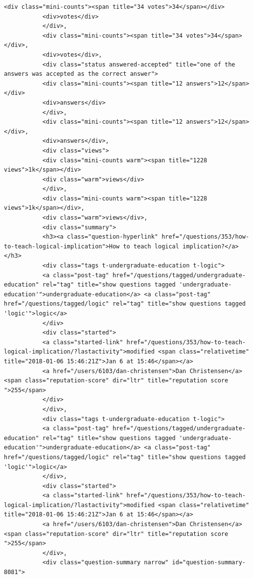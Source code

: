 \documentclass[11pt]{article}
\begin{document}
\begin{Verbatim}[commandchars=\\\{\}]
           <div class="mini-counts"><span title="34 votes">34</span></div>
           <div>votes</div>
           </div>,
           <div class="mini-counts"><span title="34 votes">34</span></div>,
           <div>votes</div>,
           <div class="status answered-accepted" title="one of the answers was accepted as the correct answer">
           <div class="mini-counts"><span title="12 answers">12</span></div>
           <div>answers</div>
           </div>,
           <div class="mini-counts"><span title="12 answers">12</span></div>,
           <div>answers</div>,
           <div class="views">
           <div class="mini-counts warm"><span title="1228 views">1k</span></div>
           <div class="warm">views</div>
           </div>,
           <div class="mini-counts warm"><span title="1228 views">1k</span></div>,
           <div class="warm">views</div>,
           <div class="summary">
           <h3><a class="question-hyperlink" href="/questions/353/how-to-teach-logical-implication">How to teach logical implication?</a></h3>
           <div class="tags t-undergraduate-education t-logic">
           <a class="post-tag" href="/questions/tagged/undergraduate-education" rel="tag" title="show questions tagged 'undergraduate-education'">undergraduate-education</a> <a class="post-tag" href="/questions/tagged/logic" rel="tag" title="show questions tagged 'logic'">logic</a>
           </div>
           <div class="started">
           <a class="started-link" href="/questions/353/how-to-teach-logical-implication/?lastactivity">modified <span class="relativetime" title="2018-01-06 15:46:21Z">Jan 6 at 15:46</span></a>
           <a href="/users/6103/dan-christensen">Dan Christensen</a> <span class="reputation-score" dir="ltr" title="reputation score ">255</span>
           </div>
           </div>,
           <div class="tags t-undergraduate-education t-logic">
           <a class="post-tag" href="/questions/tagged/undergraduate-education" rel="tag" title="show questions tagged 'undergraduate-education'">undergraduate-education</a> <a class="post-tag" href="/questions/tagged/logic" rel="tag" title="show questions tagged 'logic'">logic</a>
           </div>,
           <div class="started">
           <a class="started-link" href="/questions/353/how-to-teach-logical-implication/?lastactivity">modified <span class="relativetime" title="2018-01-06 15:46:21Z">Jan 6 at 15:46</span></a>
           <a href="/users/6103/dan-christensen">Dan Christensen</a> <span class="reputation-score" dir="ltr" title="reputation score ">255</span>
           </div>,
           <div class="question-summary narrow" id="question-summary-8081">

\end{Verbatim}
\end{document}
